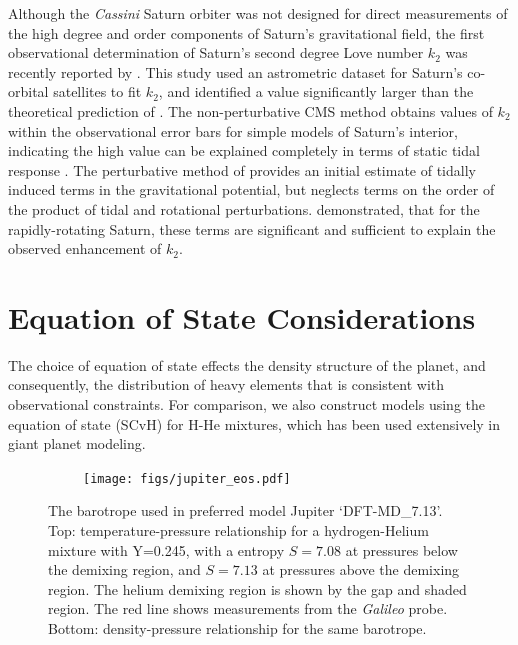 Although the \textit{Cassini} Saturn orbiter was not designed for direct measurements
of the high degree and order components of Saturn's gravitational field, the first observational
determination of Saturn's second degree Love number $k_2$ was recently reported by
\citet{lainey2016}. This study used an astrometric dataset for Saturn's co-orbital
satellites to fit $k_2$, and identified a value significantly larger than the
theoretical prediction of \citet{gavrilov1977}. The non-perturbative CMS method
obtains values of $k_2$ within the observational error bars for simple models of
Saturn's interior, indicating the high value can be explained completely in terms of
static tidal response \citep{wahl2016}. The perturbative method of
\citet{gavrilov1977} provides an initial estimate of tidally induced terms in the
gravitational potential, but neglects terms on the order of the product of tidal
and rotational perturbations. \citet{wahl2016} demonstrated, that for the
rapidly-rotating Saturn, these terms are significant and sufficient to explain the
observed enhancement of $k_2$.

\section{Equation of State Considerations}
The choice of equation of state effects the density structure of the planet, and
consequently, the distribution of heavy elements that is consistent with observational
constraints. For comparison, we also construct models using the \citet{saumon1995}
equation of state (SCvH) for H-He mixtures, which has been used extensively in giant planet
modeling. 

\begin{figure}[h!]  
  \centering
    \texttt{[image: figs/jupiter\_eos.pdf]}
\caption{ The barotrope used in preferred model Jupiter `DFT-MD\_7.13'. Top:
    temperature-pressure relationship for a hydrogen-Helium mixture with Y=0.245,
    with a entropy $S=7.08$ at pressures below the demixing region, and $S=7.13$ at
    pressures above the demixing region. The helium demixing region is shown by the
    gap and shaded region. The red line shows measurements from the \textit{Galileo}
probe. Bottom: density-pressure relationship for the same barotrope.}
\label{fig:eos}
\end{figure}

